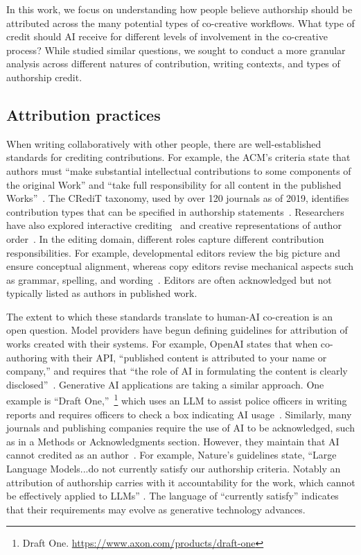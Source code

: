 In this work, we focus on understanding how people believe authorship should be attributed across the many potential types of co-creative workflows. What type of credit should AI receive for different levels of involvement in the co-creative process? While \citet{draxler2024ai} studied similar questions, we sought to conduct a more granular analysis across different natures of contribution, writing contexts, and types of authorship credit.

\subsection{Attribution practices}
\label{sec:attribution-practices}

When writing collaboratively with other people, there are well-established standards for crediting contributions. For example, the ACM's criteria state that authors must ``make substantial intellectual contributions to some components of the original Work'' and ``take full responsibility for all content in the published Works''~\cite{acm2023policy}. The CRediT taxonomy, used by over 120 journals as of 2019, identifies contribution types that can be specified in authorship statements~\cite{brand2015beyond}. Researchers have also explored interactive crediting~\cite{bd2016solving} and creative representations of author order~\cite{demaine2023every}. In the editing domain, different roles capture different contribution responsibilities. For example, developmental editors review the big picture and ensure conceptual alignment, whereas copy editors revise mechanical aspects such as grammar, spelling, and wording~\cite{reeder2016three}. Editors are often acknowledged but not typically listed as authors in published work.

The extent to which these standards translate to human-AI co-creation is an open question. Model providers have begun defining guidelines for attribution of works created with their systems. For example, OpenAI states that when co-authoring with their API, ``published content is attributed to your name or company,'' and requires that ``the role of AI in formulating the content is clearly disclosed''~\cite{openai2022sharing}. Generative AI applications are taking a similar approach. One example is ``Draft One,''~\footnote{Draft One. \url{https://www.axon.com/products/draft-one}} which uses an LLM to assist police officers in writing reports and requires officers to check a box indicating AI usage~\cite{murphy2024police}. Similarly, many journals and publishing companies require the use of AI to be acknowledged, such as in a Methods or Acknowledgments section. However, they maintain that AI cannot credited as an author~\cite{acm2023policy, arxiv, elsevier, icmje, wiley2023generative}. For example, Nature's guidelines state, ``Large Language Models...do not currently satisfy our authorship criteria. Notably an attribution of authorship carries with it accountability for the work, which cannot be effectively applied to LLMs'' \cite{nature}. The language of ``currently satisfy'' indicates that their requirements may evolve as generative technology advances. 

